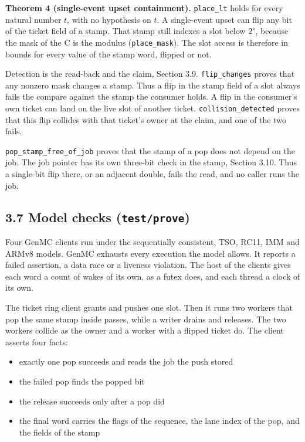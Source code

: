 \textbf{Theorem 4 (single-event upset containment).} \texttt{place\_\allowbreak{}lt} holds for every natural number \(t\), with no hypothesis on \(t\). A single-event upset can flip any bit of the ticket field of a stamp. That stamp still indexes a slot below \(2^{s}\), because the mask of the C is the modulus (\texttt{place\_\allowbreak{}mask}). The slot access is therefore in bounds for every value of the stamp word, flipped or not.

Detection is the read-back and the claim, Section 3.9. \texttt{flip\_\allowbreak{}changes} proves that any nonzero mask changes a stamp. Thus a flip in the stamp field of a slot always fails the compare against the stamp the consumer holds. A flip in the consumer's own ticket can land on the live slot of another ticket. \texttt{collision\_\allowbreak{}detected} proves that this flip collides with that ticket's owner at the claim, and one of the two fails.

\texttt{pop\_\allowbreak{}stamp\_\allowbreak{}free\_\allowbreak{}of\_\allowbreak{}job} proves that the stamp of a pop does not depend on the job. The job pointer has its own three-bit check in the stamp, Section 3.10. Thus a single-bit flip there, or an adjacent double, fails the read, and no caller runs the job.

\subsection{\texorpdfstring{3.7 Model checks (\texttt{test/\allowbreak{}prove})}{3.7 Model checks (test/prove)}}

Four GenMC clients run under the sequentially consistent, TSO, RC11, IMM and ARMv8 models. GenMC exhausts every execution the model allows. It reports a failed assertion, a data race or a liveness violation. The host of the clients gives each word a count of wakes of its own, as a futex does, and each thread a clock of its own.

The ticket ring client grants and pushes one slot. Then it runs two workers that pop the same stamp inside passes, while a writer drains and releases. The two workers collide as the owner and a worker with a flipped ticket do. The client asserts four facts:

\begin{itemize}
\item exactly one pop succeeds and reads the job the push stored
\item the failed pop finds the popped bit
\item the release succeeds only after a pop did
\item the final word carries the flags of the sequence, the lane index of the pop, and the fields of the stamp
\end{itemize}

